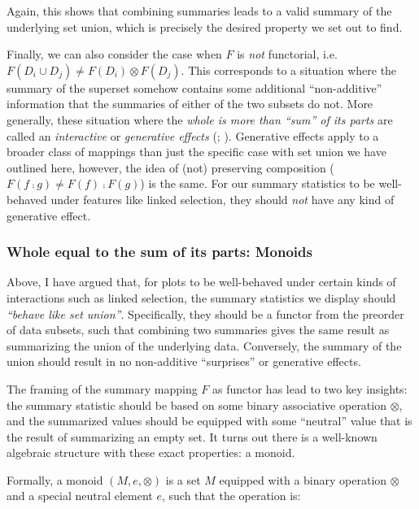 \documentclass[
]{book}
\theoremstyle{definition}
\theoremstyle{definition}
\theoremstyle{definition}
\theoremstyle{definition}
\theoremstyle{remark}
\begin{document}
Again, this shows that combining summaries leads to a valid summary of the underlying set union, which is precisely the desired property we set out to find.

Finally, we can also consider the case when \(F\) is \emph{not} functorial, i.e.~\(F(D_i \cup D_j) \neq F(D_i) \otimes F(D_j)\). This corresponds to a situation where the summary of the superset somehow contains some additional ``non-additive'' information that the summaries of either of the two subsets do not. More generally, these situation where the \emph{whole is more than ``sum'' of its parts} are called an \emph{interactive} or \emph{generative effects} (; ). Generative effects apply to a broader class of mappings than just the specific case with set union we have outlined here, however, the idea of (not) preserving composition (\(F(f ⨾g) \neq F(f) ⨾F(g)\)) is the same. For our summary statistics to be well-behaved under features like linked selection, they should \emph{not} have any kind of generative effect.

\subsubsection{Whole equal to the sum of its parts: Monoids}\label{whole-equal-to-the-sum-of-its-parts-monoids}

Above, I have argued that, for plots to be well-behaved under certain kinds of interactions such as linked selection, the summary statistics we display should \emph{``behave like set union''}. Specifically, they should be a functor from the preorder of data subsets, such that combining two summaries gives the same result as summarizing the union of the underlying data. Conversely, the summary of the union should result in no non-additive ``surprises'' or generative effects.

The framing of the summary mapping \(F\) as functor has lead to two key insights: the summary statistic should be based on some binary associative operation \(\otimes\), and the summarized values should be equipped with some ``neutral'' value that is the result of summarizing an empty set. It turns out there is a well-known algebraic structure with these exact properties: a monoid.

Formally, a monoid \((M, e, \otimes)\) is a set \(M\) equipped with a binary operation \(\otimes\) and a special neutral element \(e\), such that the operation is:
\end{document}
